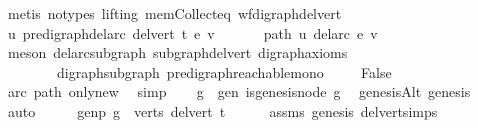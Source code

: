 \begin{isabellebody}
\ {\isacharparenleft}{\kern0pt}metis\ {\isacharparenleft}{\kern0pt}no{\isacharunderscore}{\kern0pt}types{\isacharcomma}{\kern0pt}\ lifting{\isacharparenright}{\kern0pt}\ mem{\isacharunderscore}{\kern0pt}Collect{\isacharunderscore}{\kern0pt}eq\ wf{\isacharunderscore}{\kern0pt}digraph{\isacharunderscore}{\kern0pt}del{\isacharunderscore}{\kern0pt}vert{\isacharparenright}{\kern0pt}\isanewline
\ \ \isamarkupfalse%
\ {\isachardoublequoteopen}u\ {\isasymrightarrow}\isactrlsup {\isacharasterisk}{\kern0pt}\isactrlbsub pre{\isacharunderscore}{\kern0pt}digraph{\isachardot}{\kern0pt}del{\isacharunderscore}{\kern0pt}arc\ {\isacharparenleft}{\kern0pt}del{\isacharunderscore}{\kern0pt}vert\ t{\isacharparenright}{\kern0pt}\ e\isactrlesub \ v{\isachardoublequoteclose}\ \isanewline
\ \ \isamarkupfalse%
\ \isamarkupfalse%
\ path{\isacharcolon}{\kern0pt}\ {\isachardoublequoteopen}u\ {\isasymrightarrow}\isactrlsup {\isacharasterisk}{\kern0pt}\isactrlbsub del{\isacharunderscore}{\kern0pt}arc\ e\isactrlesub \ v{\isachardoublequoteclose}\isanewline
\ \ \ \ \isamarkupfalse%
\ {\isacharparenleft}{\kern0pt}meson\ del{\isacharunderscore}{\kern0pt}arc{\isacharunderscore}{\kern0pt}subgraph\ subgraph{\isacharunderscore}{\kern0pt}del{\isacharunderscore}{\kern0pt}vert\ digraph{\isacharunderscore}{\kern0pt}axioms\isanewline
\ \ \ \ \ \ \ \ digraph{\isacharunderscore}{\kern0pt}subgraph\ pre{\isacharunderscore}{\kern0pt}digraph{\isachardot}{\kern0pt}reachable{\isacharunderscore}{\kern0pt}mono{\isacharparenright}{\kern0pt}\ \isanewline
\ \ \isamarkupfalse%
\ False\ \isamarkupfalse%
\ arc\ path\ only{\isacharunderscore}{\kern0pt}new\ \isamarkupfalse%
\ simp\isanewline
{}\isamarkupfalse%
\isanewline
\ \ \isamarkupfalse%
\ g\ \ gen{\isacharcolon}{\kern0pt}\ {\isachardoublequoteopen}is{\isacharunderscore}{\kern0pt}genesis{\isacharunderscore}{\kern0pt}node\ g{\isachardoublequoteclose}\ \isamarkupfalse%
\ genesisAlt\ genesis\ \isamarkupfalse%
\ auto\isanewline
\ \ \isamarkupfalse%
\ \isamarkupfalse%
\ genp{\isacharcolon}{\kern0pt}\ {\isachardoublequoteopen}g\ {\isasymin}\ verts\ {\isacharparenleft}{\kern0pt}del{\isacharunderscore}{\kern0pt}vert\ t{\isacharparenright}{\kern0pt}{\isachardoublequoteclose}\isanewline
\ \ \ \ \isamarkupfalse%
\ assms{\isacharparenleft}{\kern0pt}{}{\isacharparenright}{\kern0pt}\ genesis\ del{\isacharunderscore}{\kern0pt}vert{\isacharunderscore}{\kern0pt}simps\ \isamarkupfalse%

\end{isabellebody}
